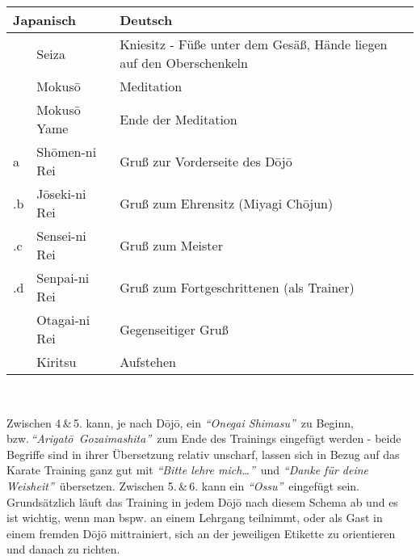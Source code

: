 	\setcounter{num}{0}\setcounter{numz}{0}
	\null\vfill\null	
	\begin{tabularx}{\textwidth}{llX}
		\multicolumn{2}{l}{\textbf{Japanisch}} 	& \textbf{Deutsch}\\
		\midrule
		\ctu		& Seiza 				& Kniesitz - Füße unter dem Gesäß, Hände liegen auf den Oberschenkeln\\
		\ctu		& Mokus\={o}			& Meditation\\
		\ctu		& Mokus\={o} Yame		& Ende der Meditation\\
		\ctu a		& Sh\={o}men-ni Rei		& Gruß zur Vorderseite des D\={o}j\={o}\\
		\thenum .b	& J\={o}seki-ni Rei		& Gruß zum Ehrensitz (Miyagi Ch\={o}jun)\\
		\thenum .c	& Sensei-ni Rei			& Gruß zum Meister\\
		\thenum .d	& Senpai-ni Rei			& Gruß zum Fortgeschrittenen (als Trainer)\\
		\ctu		& Otagai-ni Rei			& Gegenseitiger Gruß\\
		\ctu		& Kiritsu				& Aufstehen\\		
		\midrule
	\end{tabularx}\\\null\vfill\null
	\begin{center}
		\parbox{\textwidth-2\tabcolsep}{Zwischen 4\,\&\,5. kann, je nach D\={o}j\={o}, ein \textit{\textquotedblleft Onegai Shimasu\textquotedblright}~zu Beginn, bzw.\,\textit{\mbox{\textquotedblleft Arigat\={o} Gozaimashita\textquotedblright}}~zum Ende des Trainings eingefügt werden - beide Begriffe sind in ihrer Übersetzung relativ unscharf, lassen sich in Bezug auf das Karate Training ganz gut mit \textit{\textquotedblleft Bitte lehre mich\dots\textquotedblright}~und \textit{\textquotedblleft Danke für deine Weisheit\textquotedblright}~übersetzen. Zwischen 5.\,\&\,6. kann ein \textit{\textquotedblleft Ossu\textquotedblright}~eingefügt sein. Grundsätzlich läuft das Training in jedem D\={o}j\={o} nach diesem Schema ab und es ist wichtig, wenn man bspw. an einem Lehrgang teilnimmt, oder als Gast in einem fremden D\={o}j\={o} mittrainiert, sich an der jeweiligen Etikette zu orientieren und danach zu richten.}
	\end{center}\null\vfill\null